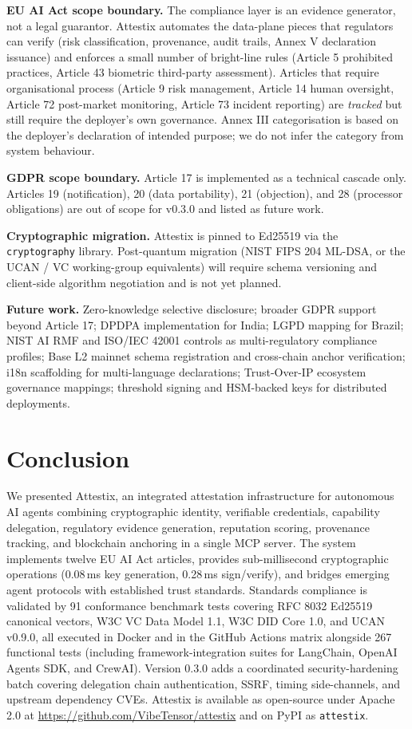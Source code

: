 \documentclass[conference]{IEEEtran}
\begin{document}
\textbf{EU AI Act scope boundary.} The compliance layer is an evidence generator, not a legal guarantor. Attestix automates the data-plane pieces that regulators can verify (risk classification, provenance, audit trails, Annex V declaration issuance) and enforces a small number of bright-line rules (Article 5 prohibited practices, Article 43 biometric third-party assessment). Articles that require organisational process (Article 9 risk management, Article 14 human oversight, Article 72 post-market monitoring, Article 73 incident reporting) are \emph{tracked} but still require the deployer's own governance. Annex III categorisation is based on the deployer's declaration of intended purpose; we do not infer the category from system behaviour.

\textbf{GDPR scope boundary.} Article 17 is implemented as a technical cascade only. Articles 19 (notification), 20 (data portability), 21 (objection), and 28 (processor obligations) are out of scope for v0.3.0 and listed as future work.

\textbf{Cryptographic migration.} Attestix is pinned to Ed25519 via the \texttt{cryptography} library. Post-quantum migration (NIST FIPS 204 ML-DSA, or the UCAN / VC working-group equivalents) will require schema versioning and client-side algorithm negotiation and is not yet planned.

\textbf{Future work.} Zero-knowledge selective disclosure; broader GDPR support beyond Article 17; DPDPA implementation for India; LGPD mapping for Brazil; NIST AI RMF and ISO/IEC 42001 controls as multi-regulatory compliance profiles; Base L2 mainnet schema registration and cross-chain anchor verification; i18n scaffolding for multi-language declarations; Trust-Over-IP ecosystem governance mappings; threshold signing and HSM-backed keys for distributed deployments.

\section{Conclusion}

We presented Attestix, an integrated attestation infrastructure for autonomous AI agents combining cryptographic identity, verifiable credentials, capability delegation, regulatory evidence generation, reputation scoring, provenance tracking, and blockchain anchoring in a single MCP server. The system implements twelve EU AI Act articles, provides sub-millisecond cryptographic operations (0.08\,ms key generation, 0.28\,ms sign/verify), and bridges emerging agent protocols with established trust standards. Standards compliance is validated by 91 conformance benchmark tests covering RFC 8032 Ed25519 canonical vectors, W3C VC Data Model 1.1, W3C DID Core 1.0, and UCAN v0.9.0, all executed in Docker and in the GitHub Actions matrix alongside 267 functional tests (including framework-integration suites for LangChain, OpenAI Agents SDK, and CrewAI). Version 0.3.0 adds a coordinated security-hardening batch covering delegation chain authentication, SSRF, timing side-channels, and upstream dependency CVEs. Attestix is available as open-source under Apache 2.0 at \url{https://github.com/VibeTensor/attestix} and on PyPI as \texttt{attestix}.
\end{document}
